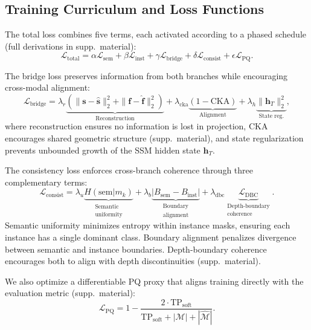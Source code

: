 \documentclass[10pt,twocolumn,letterpaper]{article}
\newcommand{\lsem}{\mathcal{L}_{\text{sem}}}
\newcommand{\linst}{\mathcal{L}_{\text{inst}}}
\newcommand{\lbridge}{\mathcal{L}_{\text{bridge}}}
\newcommand{\lconsist}{\mathcal{L}_{\text{consist}}}
\newcommand{\lpq}{\mathcal{L}_{\text{PQ}}}
\newcommand{\ltotal}{\mathcal{L}_{\text{total}}}
\begin{document}
\subsection{Training Curriculum and Loss Functions}
\label{sec:curriculum}

The total loss combines five terms, each activated according to a phased schedule (full derivations in supp.\ material):
\begin{equation}
\ltotal = \alpha \lsem + \beta \linst + \gamma \lbridge + \delta \lconsist + \epsilon \lpq.
\label{eq:total_loss}
\end{equation}

The bridge loss preserves information from both branches while encouraging cross-modal alignment:
\begin{equation}
\lbridge = \lambda_r \underbrace{(\|\mathbf{s} {-} \hat{\mathbf{s}}\|_2^2 {+} \|\mathbf{f} {-} \hat{\mathbf{f}}\|_2^2)}_{\text{Reconstruction}} + \lambda_{\text{cka}} \underbrace{(1 {-} \text{CKA})}_{\text{Alignment}} + \lambda_h \underbrace{\|\mathbf{h}_T\|_2^2}_{\text{State reg.}}\!,
\label{eq:bridge_loss}
\end{equation}
where reconstruction ensures no information is lost in projection, CKA~\cite{kornblith2019cka} encourages shared geometric structure (supp.\ material), and state regularization prevents unbounded growth of the SSM hidden state $\mathbf{h}_T$.

The consistency loss enforces cross-branch coherence through three complementary terms:
\begin{equation}
\lconsist = \lambda_u \underbrace{H(\text{sem} | m_k)}_{\substack{\text{Semantic}\\\text{uniformity}}} + \lambda_b \underbrace{|B_{\text{sem}} {-} B_{\text{inst}}|}_{\substack{\text{Boundary}\\\text{alignment}}} + \lambda_{\text{dbc}} \underbrace{\mathcal{L}_{\text{DBC}}}_{\substack{\text{Depth-boundary}\\\text{coherence}}}\!.
\label{eq:consistency_loss}
\end{equation}
Semantic uniformity minimizes entropy within instance masks, ensuring each instance has a single dominant class. Boundary alignment penalizes divergence between semantic and instance boundaries. Depth-boundary coherence encourages both to align with depth discontinuities (supp.\ material).

We also optimize a differentiable PQ proxy that aligns training directly with the evaluation metric (supp.\ material):
\begin{equation}
\lpq = 1 - \frac{2 \cdot \text{TP}_{\text{soft}}}{\text{TP}_{\text{soft}} + |\mathcal{M}| + |\hat{\mathcal{M}}|}.
\label{eq:pq_loss}
\end{equation}
\end{document}
